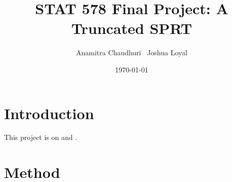 \documentclass[11pt]{article}
\begin{document}
\title{  {\LARGE STAT 578 Final Project: A Truncated SPRT} }

\author{
    Anamitra Chaudhuri \,
    Joshua Loyal
}

\date{\today}
\maketitle

\section{Introduction}

This project is on \citet{tantara1977} and \citet{tantara1982}.

\section{Method}
\end{document}
